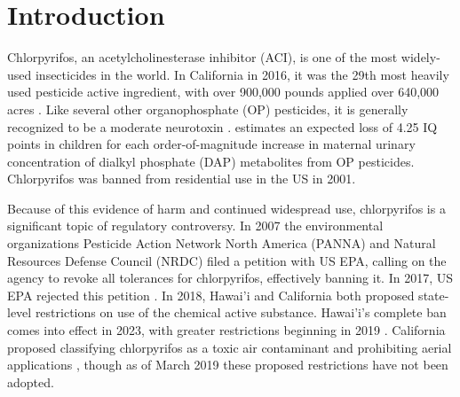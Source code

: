 \documentclass[ijerph,article,submit,oneauthor,pdftex]{Definitions/mdpi}
\begin{document}

\section{Introduction}
Chlorpyrifos, an acetylcholinesterase inhibitor (ACI), is one of the most widely-used insecticides in the world. In California in 2016, it was the 29th most heavily used pesticide active ingredient, with over 900,000 pounds applied over 640,000 acres \citep{PesticideUseReporting2017}. Like several other organophosphate (OP) pesticides, it is generally recognized to be a moderate neurotoxin \citetext{\citealp[p  67]{WorldHealthOrganizationWHORecommendedClassification2010}, \citealp{GrandjeanNeurobehaviouralEffectsDevelopmental2014}, \citealp{USEPAChlorpyrifosRevisedHuman2016}, \citealp{BurkeDevelopmentalNeurotoxicityOrganophosphorus2017}, \citealp[and further citations in][]{TrasandeWhenEnoughData2017}}. \citet{BellingerStrategyComparingContributions2012} estimates an expected loss of 4.25 IQ points in children for each order-of-magnitude increase in maternal urinary concentration of dialkyl phosphate (DAP) metabolites from OP pesticides. Chlorpyrifos was banned from residential use in the US in 2001.

Because of this evidence of harm and continued widespread use, chlorpyrifos is a significant topic of regulatory controversy. In 2007 the environmental organizations Pesticide Action Network North America (PANNA) and Natural Resources Defense Council (NRDC) filed a petition with US EPA, calling on the agency to revoke all tolerances for chlorpyrifos, effectively banning it. In 2017, US EPA rejected this petition \citep{USEPAChlorpyrifosOrderDenying2017}. In 2018, Hawai'i and California both proposed state-level restrictions on use of the chemical active substance. Hawai'i's complete ban comes into effect in 2023, with greater restrictions beginning in 2019 \citep{HawaiiBanPesticides2018}. California proposed classifying chlorpyrifos as a toxic air contaminant and prohibiting aerial applications \citep{GreenwireCalifRecommendsRestrictions2018}, though as of March 2019 these proposed restrictions have not been adopted.
\end{document}
